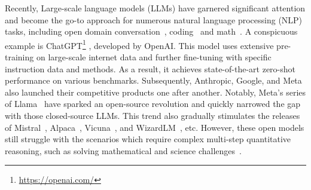 Recently, Large-scale language models (LLMs) have  garnered significant attention and become the go-to approach for numerous natural language processing (NLP) tasks, including open domain conversation~\citep{ouyang2022training,openai2023gpt4,touvron2023llama}, coding~\citep{chen2021evaluating-humaneval,codet5,li2023starcoder} and math~\citep{taylor2022galactica,lewkowycz2022solving, shao2024-deepseekmath, yang2024-qwen2.5-math}. A conspicuous example is ChatGPT\footnote{\quad \url{https://openai.com/}\label{fn:chatgpt}}
, developed by OpenAI. This model uses extensive pre-training on large-scale internet data and further fine-tuning with specific instruction data and methods. As a result, it achieves state-of-the-art zero-shot performance on various benchmarks. Subsequently, Anthropic,  Google, and Meta  also launched their competitive products one after another. Notably, Meta's series of  Llama~\citep{touvron2023llama, touvron2023llama2, dubey2024-llama3} have sparked an open-source revolution and quickly narrowed the gap with those closed-source LLMs. This trend also gradually stimulates the releases of Mistral~\citep{jiang2023mistral}, Alpaca~\citep{alpaca}, Vicuna~\citep{vicuna2023}, and WizardLM~\citep{xu2023wizardlm}, etc. However, these open models still struggle with the scenarios which require  complex multi-step  quantitative reasoning, such as solving mathematical and science challenges~\citep{ahn2024-comprehention-LLM, long2024-llms-survey}. 

